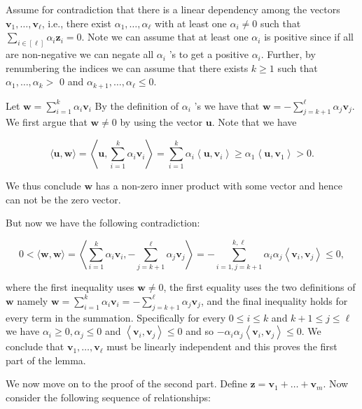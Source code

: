 \documentclass[10pt]{article}
\begin{document}
Assume for contradiction that there is a linear dependency among the vectors $\mathbf{v}_{1}, \ldots, \mathbf{v}_{\ell}$, i.e., there exist $\alpha_{1}, \ldots, \alpha_{\ell}$ with at least one $\alpha_{i} \neq 0$ such that $\sum_{i \in[\ell]} \alpha_{i} \mathbf{z}_{i}=0$. Note we can assume that at least one $\alpha_{i}$ is positive since if all are non-negative we can negate all $\alpha_{i}$ 's to get a positive $\alpha_{i}$. Further, by renumbering the indices we can assume that there exists $k \geq 1$ such that $\alpha_{1}, \ldots, \alpha_{k}>$ 0 and $\alpha_{k+1}, \ldots, \alpha_{\ell} \leq 0$.

Let $\mathbf{w}=\sum_{i=1}^{k} \alpha_{i} \mathbf{v}_{i}$ By the definition of $\alpha_{i}$ 's we have that $\mathbf{w}=-\sum_{j=k+1}^{\ell} \alpha_{j} \mathbf{v}_{j}$. We first argue that $\mathbf{w} \neq 0$ by using the vector $\mathbf{u}$. Note that we have

$$
\langle\mathbf{u}, \mathbf{w}\rangle=\left\langle\mathbf{u}, \sum_{i=1}^{k} \alpha_{i} \mathbf{v}_{i}\right\rangle=\sum_{i=1}^{k} \alpha_{i}\left\langle\mathbf{u}, \mathbf{v}_{i}\right\rangle \geq \alpha_{1}\left\langle\mathbf{u}, \mathbf{v}_{1}\right\rangle>0 .
$$

We thus conclude $\mathbf{w}$ has a non-zero inner product with some vector and hence can not be the zero vector.

But now we have the following contradiction:

$$
0<\langle\mathbf{w}, \mathbf{w}\rangle=\left\langle\sum_{i=1}^{k} \alpha_{i} \mathbf{v}_{i},-\sum_{j=k+1}^{\ell} \alpha_{j} \mathbf{v}_{j}\right\rangle=-\sum_{i=1, j=k+1}^{k, \ell} \alpha_{i} \alpha_{j}\left\langle\mathbf{v}_{i}, \mathbf{v}_{j}\right\rangle \leq 0,
$$

where the first inequality uses $\mathbf{w} \neq 0$, the first equality uses the two definitions of $\mathbf{w}$ namely $\mathbf{w}=\sum_{i=1}^{k} \alpha_{i} \mathbf{v}_{i}=-\sum_{j=k+1}^{\ell} \alpha_{j} \mathbf{v}_{j}$, and the final inequality holds for every term in the summation. Specifically for every $0 \leq i \leq k$ and $k+1 \leq j \leq \ell$ we have $\alpha_{i} \geq 0, \alpha_{j} \leq 0$ and $\left\langle\mathbf{v}_{i}, \mathbf{v}_{j}\right\rangle \leq 0$ and so $-\alpha_{i} \alpha_{j}\left\langle\mathbf{v}_{i}, \mathbf{v}_{j}\right\rangle \leq 0$. We conclude that $\mathbf{v}_{1}, \ldots, \mathbf{v}_{\ell}$ must be linearly independent and this proves the first part of the lemma.

We now move on to the proof of the second part. Define $\mathbf{z}=\mathbf{v}_{1}+\ldots+\mathbf{v}_{m}$. Now consider the following sequence of relationships:
\end{document}
